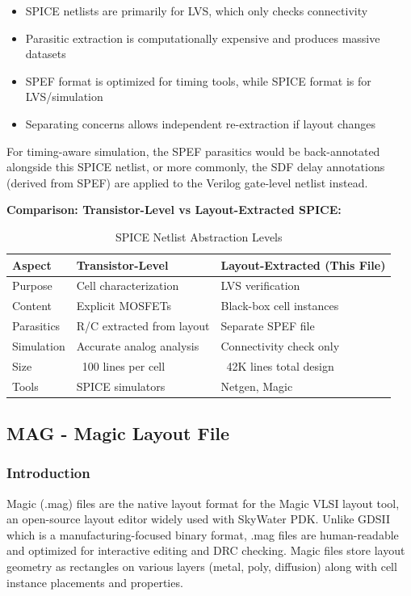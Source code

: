 \documentclass[12pt,a4paper]{article}
\begin{document}
\begin{itemize}
    \item SPICE netlists are primarily for LVS, which only checks connectivity
    \item Parasitic extraction is computationally expensive and produces massive datasets
    \item SPEF format is optimized for timing tools, while SPICE format is for LVS/simulation
    \item Separating concerns allows independent re-extraction if layout changes
\end{itemize}

For timing-aware simulation, the SPEF parasitics would be back-annotated alongside this SPICE netlist, or more commonly, the SDF delay annotations (derived from SPEF) are applied to the Verilog gate-level netlist instead.

\textbf{Comparison: Transistor-Level vs Layout-Extracted SPICE:}

\begin{table}[H]
\centering
\caption{SPICE Netlist Abstraction Levels}
\label{tab:spice_comparison}
\begin{tabular}{@{}lll@{}}
\toprule
\textbf{Aspect} & \textbf{Transistor-Level} & \textbf{Layout-Extracted (This File)} \\
\midrule
Purpose & Cell characterization & LVS verification \\
Content & Explicit MOSFETs & Black-box cell instances \\
Parasitics & R/C extracted from layout & Separate SPEF file \\
Simulation & Accurate analog analysis & Connectivity check only \\
Size & ~100 lines per cell & ~42K lines total design \\
Tools & SPICE simulators & Netgen, Magic \\
\bottomrule
\end{tabular}
\end{table}


\newpage
\subsection{MAG - Magic Layout File}

\subsubsection{Introduction}

Magic (.mag) files are the native layout format for the Magic VLSI layout tool, an open-source layout editor widely used with SkyWater PDK. Unlike GDSII which is a manufacturing-focused binary format, .mag files are human-readable and optimized for interactive editing and DRC checking. Magic files store layout geometry as rectangles on various layers (metal, poly, diffusion) along with cell instance placements and properties.
\end{document}
